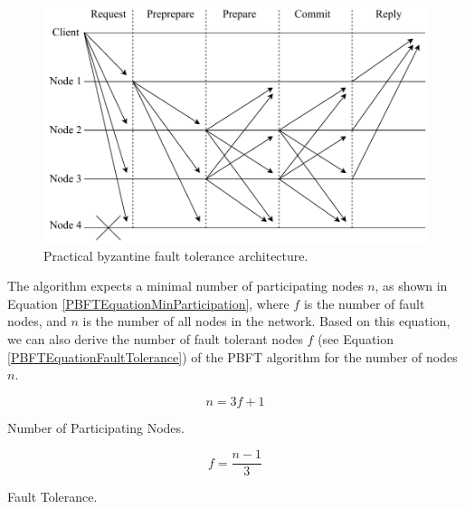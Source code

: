 \begin{figure}[h]
	\centering
	\includegraphics[width=0.9\linewidth]{obrazky-figures/PBFT.pdf}
	\caption{Practical byzantine fault tolerance architecture.}
	\label{PBFTDiagram}
\end{figure}


The algorithm expects a minimal number of participating nodes $n$, as shown in Equation \ref{PBFTEquationMinParticipation}, where $f$ is the number of fault nodes, and $n$ is the number of all nodes in the network. Based on this equation, we can also derive the number of fault tolerant nodes $f$ (see Equation \ref{PBFTEquationFaultTolerance}) of the PBFT algorithm for the number of nodes $n$. \\

\newenvironment{conditions}
  {\par\vspace{\abovedisplayskip}\noindent\begin{tabular}{>{$}l<{$} @{${}={}$} l}}
{\end{tabular}\par\vspace{\belowdisplayskip}}
  

\begin{equation}
        n = 3 f + 1
    \label{PBFTEquationMinParticipation}
\end{equation}
\begin{center}
    Number of Participating Nodes.
\end{center}

\begin{equation}
        f  = \frac{n - 1}{3} 
    \label{PBFTEquationFaultTolerance}
\end{equation}
\begin{center}
    Fault Tolerance.
\end{center}

